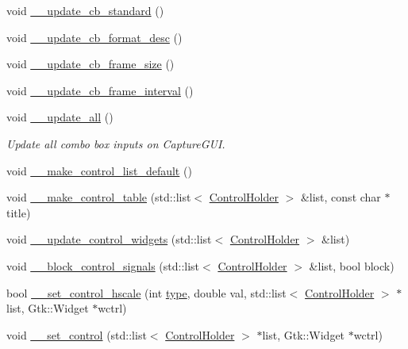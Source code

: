 \begin{DoxyCompactItemize}
\item 
void \hyperlink{class_v_s_s_s___g_u_i_1_1_v4_l_interface_a0decb6d5b23790bf902f9d202d727235}{\+\_\+\+\_\+update\+\_\+cb\+\_\+standard} ()
\item 
void \hyperlink{class_v_s_s_s___g_u_i_1_1_v4_l_interface_ad2da97031a8ca5d9e2d99f5a5459c267}{\+\_\+\+\_\+update\+\_\+cb\+\_\+format\+\_\+desc} ()
\item 
void \hyperlink{class_v_s_s_s___g_u_i_1_1_v4_l_interface_ab30bca15d7c9ffb5d3e7bc38ad2def25}{\+\_\+\+\_\+update\+\_\+cb\+\_\+frame\+\_\+size} ()
\item 
void \hyperlink{class_v_s_s_s___g_u_i_1_1_v4_l_interface_a0eeae871fc38dab3693860f6f391e062}{\+\_\+\+\_\+update\+\_\+cb\+\_\+frame\+\_\+interval} ()
\item 
void \hyperlink{class_v_s_s_s___g_u_i_1_1_v4_l_interface_ac3fe0a20fd30c6e9505eb375ef63e52e}{\+\_\+\+\_\+update\+\_\+all} ()
\begin{DoxyCompactList}\small\item\em Update all combo box inputs on Capture\+G\+UI. \end{DoxyCompactList}\item 
void \hyperlink{class_v_s_s_s___g_u_i_1_1_v4_l_interface_af0b71067889b902882e4f181b0a04aed}{\+\_\+\+\_\+make\+\_\+control\+\_\+list\+\_\+default} ()
\item 
void \hyperlink{class_v_s_s_s___g_u_i_1_1_v4_l_interface_a4f70f4aaf3b7520d2f28ca06e3e94bd4}{\+\_\+\+\_\+make\+\_\+control\+\_\+table} (std\+::list$<$ \hyperlink{namespace_v_s_s_s___g_u_i_a9eff2f5504f050458ee4bcf362482a8d}{Control\+Holder} $>$ \&list, const char $\ast$title)
\item 
void \hyperlink{class_v_s_s_s___g_u_i_1_1_v4_l_interface_afbb5daccfdce20180578025c108ef65b}{\+\_\+\+\_\+update\+\_\+control\+\_\+widgets} (std\+::list$<$ \hyperlink{namespace_v_s_s_s___g_u_i_a9eff2f5504f050458ee4bcf362482a8d}{Control\+Holder} $>$ \&list)
\item 
void \hyperlink{class_v_s_s_s___g_u_i_1_1_v4_l_interface_a677d3f2d0246528bafd19cf2d3dccf98}{\+\_\+\+\_\+block\+\_\+control\+\_\+signals} (std\+::list$<$ \hyperlink{namespace_v_s_s_s___g_u_i_a9eff2f5504f050458ee4bcf362482a8d}{Control\+Holder} $>$ \&list, bool block)
\item 
bool \hyperlink{class_v_s_s_s___g_u_i_1_1_v4_l_interface_aa14a838434102fd12d5d0ffbc242e753}{\+\_\+\+\_\+set\+\_\+control\+\_\+hscale} (int \hyperlink{classstd_1_1conditional_1_1type}{type}, double val, std\+::list$<$ \hyperlink{namespace_v_s_s_s___g_u_i_a9eff2f5504f050458ee4bcf362482a8d}{Control\+Holder} $>$ $\ast$list, Gtk\+::\+Widget $\ast$wctrl)
\item 
void \hyperlink{class_v_s_s_s___g_u_i_1_1_v4_l_interface_ad6eddc5cedbaf1b0e87b330aae937b46}{\+\_\+\+\_\+set\+\_\+control} (std\+::list$<$ \hyperlink{namespace_v_s_s_s___g_u_i_a9eff2f5504f050458ee4bcf362482a8d}{Control\+Holder} $>$ $\ast$list, Gtk\+::\+Widget $\ast$wctrl)
\end{DoxyCompactItemize}
